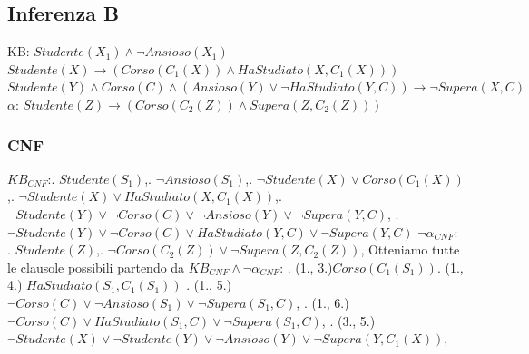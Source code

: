 \documentclass[a4paper, 12pt]{article}
\begin{document}
\subsection{Inferenza B}
KB: \newline
$Studente(X_1)\land \lnot Ansioso(X_1)$ \newline
$Studente(X) \rightarrow (Corso(C_1(X)) \land HaStudiato(X, C_1(X)))$ \newline
$Studente(Y)\land Corso(C) \land (Ansioso(Y) \lor \lnot HaStudiato(Y,C)) \rightarrow \lnot Supera(X, C)$ \newline
$\alpha$:\newline
$Studente(Z) \rightarrow ( Corso(C_2(Z)) \land Supera(Z, C_2(Z)))$ \newline
\subsubsection{CNF}
$KB_{CNF}$:. \;\;$Studente(S_1)$,. \;\; $\lnot Ansioso(S_1)$,. \;\;$\lnot Studente(X) \lor Corso(C_1(X))$,. \;\;$\lnot Studente(X) \lor HaStudiato(X, C_1(X))$,. \;\;$\lnot Studente(Y) \lor \lnot Corso(C) \lor \lnot Ansioso(Y) \lor \lnot Supera(Y, C)$, . \;\;$\lnot Studente(Y) \lor \lnot Corso(C) \lor HaStudiato(Y, C) \lor \lnot Supera(Y, C)$ \newline
$\lnot \alpha_{CNF}$: . \;\;$Studente(Z)$,. \;\;$\lnot Corso(C_2(Z)) \lor \lnot Supera(Z, C_2(Z))$,\newline
Otteniamo tutte le clausole possibili partendo da $ KB_{CNF} \land \lnot \alpha_{CNF} $: . (1., 3.)\;\;$ Corso(C_1(S_1)) $. (1., 4.)\;\; $ HaStudiato(S_1, C_1(S_1)) $ . (1., 5.)\;\; $ \lnot Corso(C) \lor \lnot Ansioso(S_1) \lor \lnot Supera(S_1, C) $, . (1., 6.)\;\; $ \lnot Corso(C) \lor HaStudiato(S_1, C) \lor \lnot Supera(S_1, C) $, . (3., 5.)\;\; $ \lnot Studente(X) \lor \lnot Studente(Y) \lor \lnot Ansioso(Y) \lor \lnot Supera(Y, C_1(X)) $, \newline
\end{document}
